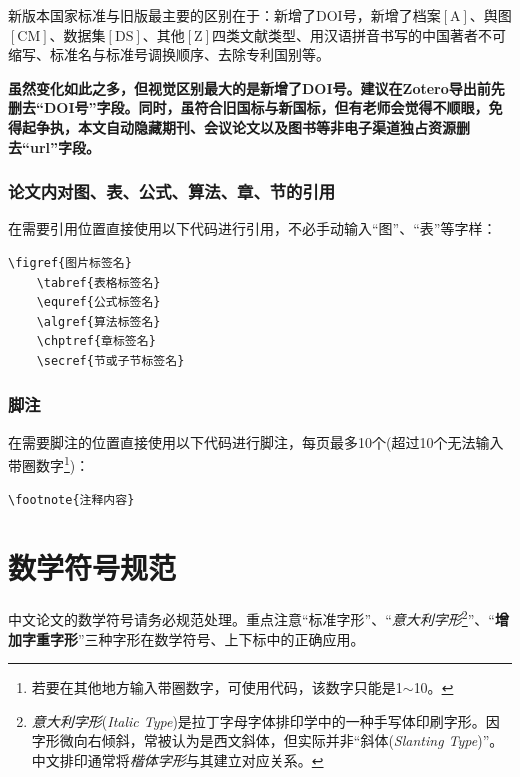 新版本国家标准与旧版最主要的区别\cite{XuYu2016GB77142015YuGB}在于：新增了DOI号，新增了档案$[\mathrm{A}]$、舆图$[\mathrm{CM}]$、数据集$[\mathrm{DS}]$、其他$[\mathrm{Z}]$四类文献类型、用汉语拼音书写的中国著者不可缩写、标准名与标准号调换顺序、去除专利国别等。

\textbf{虽然变化如此之多，但视觉区别最大的是新增了DOI号。建议在Zotero导出前先删去“DOI号”字段。同时，虽符合旧国标与新国标，但有老师会觉得不顺眼，免得起争执，本文自动隐藏期刊、会议论文以及图书等非电子渠道独占资源删去“url”字段。}

\subsubsection{论文内对图、表、公式、算法、章、节的引用}

在需要引用位置直接使用以下代码进行引用，不必手动输入“图”、“表”等字样：

\begin{lstlisting}[language={[LaTeX]TeX}]
    \figref{图片标签名}
    \tabref{表格标签名}
    \equref{公式标签名}
    \algref{算法标签名}
    \chptref{章标签名}
    \secref{节或子节标签名}
\end{lstlisting}

\subsubsection{脚注}

在需要脚注的位置直接使用以下代码进行脚注，每页最多10个(超过10个无法输入带圈数字\footnote{若要在其他地方输入带圈数字，可使用代码，该数字只能是1$\sim$10。})：

\begin{lstlisting}[language={[LaTeX]TeX}]
    \footnote{注释内容}
\end{lstlisting}


\clearpage
\section{数学符号规范}

中文论文的数学符号请务必规范处理。重点注意“标准字形”、“\textit{意大利字形}\footnote{\textit{意大利字形}(\textit{Italic Type})是拉丁字母字体排印学中的一种手写体印刷字形。因字形微向右倾斜，常被认为是西文斜体，但实际并非“斜体({\hspace{-7em}\textsl{Slanting Type}})”。中文排印通常将\textit{楷体字形}与其建立对应关系。}”、“\textbf{增加字重字形}”三种字形在数学符号、上下标中的正确应用。

